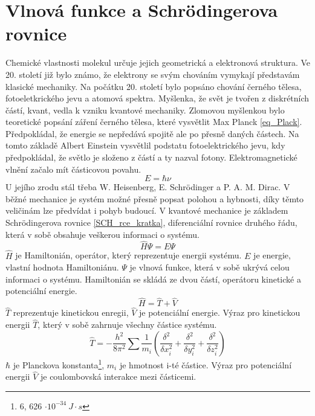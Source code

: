 \documentclass[
  digital, %
  table,   %
  lof,     %
  lot,     %
]{fithesis3}
\begin{document}
\section{Vlnová funkce a Schrödingerova rovnice}
Chemické vlastnosti molekul určuje jejich geometrická a elektronová struktura. Ve 20. století již bylo známo, že elektrony se svým chováním vymykají představám klasické mechaniky. Na počátku 20. století bylo popsáno chování černého tělesa, fotoeletkrického jevu a atomová spektra. Myšlenka, že svět je tvořen z diskrétních částí, kvant, vedla k vzniku kvantové mechaniky. Zlomovou myšlenkou bylo teoretické popsání záření černého tělesa, které vysvětlit Max Planck \ref{eq_Plack}. Předpokládal, že energie se nepředává spojitě ale po přesně daných částech. Na tomto základě Albert Einstein vysvětlil podstatu fotoelektrického jevu, kdy předpokládal, že světlo je složeno z částí a ty nazval fotony. Elektromagnetické vlnění začalo mít částicovou povahu.
\begin{equation}
E = \hbar \nu
\label{eq_Plack}
\end{equation}
U jejího zrodu stál třeba W. Heisenberg, E. Schrödinger a P. A. M. Dirac. V běžné mechanice je systém možné přesně popsat polohou a hybnosti, díky těmto veličinám lze předvídat i pohyb budoucí. V kvantové mechanice je základem Schrödingerova rovnice \ref{SCH_rce_kratka}, diferenciální rovnice druhého řádu, která v sobě obsahuje veškerou informaci o systému.\cite{polak2000obecna}
\begin{equation}
\widehat{H} \Psi = E \Psi
\label{SCH_rce_kratka}
\end{equation}
$\widehat{H}$ je Hamiltonián, operátor, který reprezentuje energii systému. $E$ je energie, vlastní hodnota Hamiltoniánu. $\Psi$ je vlnová funkce, která v sobě ukrývá celou informaci o systému. Hamiltonián se skládá ze dvou částí, operátoru kinetické a potenciální energie.
\begin{equation}
\widehat{H} = \widehat{T} + \widehat{V}
\end{equation}
$\widehat{T}$ reprezentuje kinetickou enregii, $\widehat{V}$ je potenciální energie.
Výraz pro kinetickou energii $\widehat{T}$, který v sobě zahrnuje všechny částice systému. 
\begin{equation}
\widehat{T} = - \frac{h^2}{8 \pi ^2} \sum \frac{1}{m_i} \left( \frac{\delta^2}{\delta x_i^2} +\frac{\delta^2}{\delta y_i^2} +\frac{\delta^2}{\delta z_i^2} \right)
\end{equation}
$\hbar$  je Planckova konstanta\footnote{6, 626  $\cdot 10^{-34} ~ J \cdot s$}, $m_i$ je hmotnost i-té částice. Výraz pro potenciální energii $\widehat{V}$ je coulombovská interakce mezi částicemi.
\end{document}
